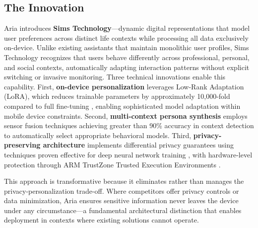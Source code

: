 \documentclass[11pt]{article}
\begin{document}
\vspace*{-10pt}
\subsection{The Innovation}
\vspace*{-8pt}
Aria introduces \textbf{Sims Technology}---dynamic digital representations that model user preferences across distinct life contexts while processing all data exclusively on-device. Unlike existing assistants that maintain monolithic user profiles, Sims Technology recognizes that users behave differently across professional, personal, and social contexts, automatically adapting interaction patterns without explicit switching or invasive monitoring.
Three technical innovations enable this capability. First, \textbf{on-device personalization} leverages Low-Rank Adaptation (LoRA), which reduces trainable parameters by approximately 10,000-fold compared to full fine-tuning \cite{hu2022lora}, enabling sophisticated model adaptation within mobile device constraints. Second, \textbf{multi-context persona synthesis} employs sensor fusion techniques achieving greater than 90\% accuracy in context detection \cite{wang2019deep} to automatically select appropriate behavioral models. Third, \textbf{privacy-preserving architecture} implements differential privacy guarantees using techniques proven effective for deep neural network training \cite{abadi2016deep}, with hardware-level protection through ARM TrustZone Trusted Execution Environments \cite{pinto2019demystifying}.

This approach is transformative because it eliminates rather than manages the privacy-personalization trade-off. Where competitors offer privacy controls or data minimization, Aria ensures sensitive information never leaves the device under any circumstance---a fundamental architectural distinction that enables deployment in contexts where existing solutions cannot operate.

\vspace*{-10pt}
\end{document}
